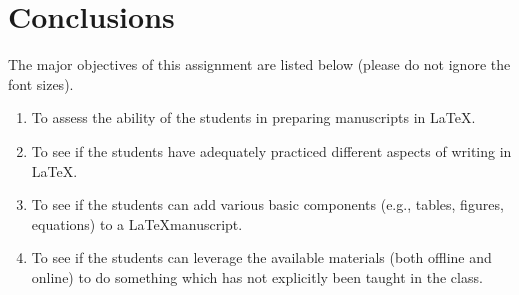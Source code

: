 \documentclass[11pt]{article}
\begin{document}
 \section{Conclusions}
 The major objectives of this assignment are listed below (please do not ignore the font sizes).
 \begin{enumerate}
     \item \begin{Large} To assess the ability of the students in preparing manuscripts in  \LaTeX. \end{Large}
     \item \begin{large} To see if the students have adequately practiced different aspects of writing in  \LaTeX . \end{large}
     \item \begin{normalsize} To see if the students can add various basic components (e.g., tables, figures, equations) to a 
     \LaTeX \space manuscript. \end{normalsize}
     \pagebreak
      \item \begin{scriptsize} To see if the students can leverage the available materials (both offline and online) to do something which has not explicitly been taught in the class. \end{scriptsize}
 \end{enumerate}
\printbibliography
\end{document}
